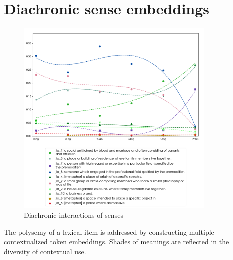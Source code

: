 \section{Diachronic sense embeddings}
\begin{figure}[H]
    \centering
    \includegraphics[width=0.85\textwidth]{figures/jia_en}
    \caption{Diachronic interactions of senses}
    \label{fig:jia_en}
\end{figure}


The polysemy of a lexical item is addressed by constructing multiple contextualized token embeddings. Shades of meanings are reflected in the diversity of contextual use.

